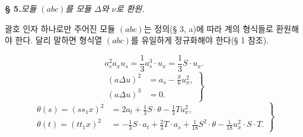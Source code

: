 
\begin{center}
\textbf{§ 5.}\quad\emph{모듈 $(abc)$를 모듈 $\Delta$와 $\nu$로 환원.}
\end{center}

괄호 인자 하나로만 주어진 모듈 $(abc)$는 정의(§ 3, a)에 따라 계의 형식들로 환원해야 한다. 달리 말하면 형식열 $(abc)$를 유일하게 정규화해야 한다(§ 1 참조).

\[
a_s^2a_xu_s=\frac13a_s^3\cdot u_x=\frac13S\cdot u_x. \tag{2.}
\]
\[
\left.
\begin{aligned}
(a\Delta u)^2&=a_s-\frac{S}{6}u_x^2,\\
(a\Delta u)^3&=0.
\end{aligned}
\right\} \tag{3.}
\]
\[
\left.
\begin{aligned}
\theta(s)=(ss_1x)^2&=2a_t+\frac13S\cdot\theta-\frac13Tu_x^2,\\
\theta(t)=(tt_1x)^2&=-\frac13S\cdot a_t+\frac23T\cdot a_s+\frac1{18}S^2\cdot\theta-\frac1{18}u_x^2\cdot S\cdot T.
\end{aligned}
\right\} \tag{4.}
\]
\]
